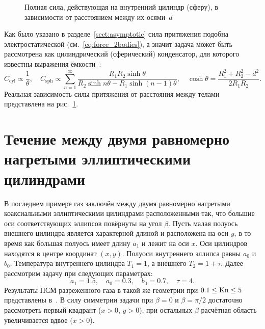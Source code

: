 \begin{figure}[ht]
    \centering
    \caption{Полная сила, действующая на внутренний цилиндр (сферу),
        в зависимости от расстоянием между их осями~\(d\)}
    \label{fig:forces:distance}
\end{figure}

Как было указано в разделе~\ref{sect:asymptotic} сила притяжения подобна электростатической (см.~\eqref{eq:force_2bodies}),
а значит задача может быть рассмотрена как цилиндрический (сферический) конденсатор,
для которого известны выражения ёмкости~\cite{Smythe1954}:
\begin{equation}
    C_\mathrm{cyl} \propto \frac1{\theta}, \quad
    C_\mathrm{sph} \propto  \sum_{n=1}^\infty \frac{R_1 R_2 \sinh\theta} {R_2\sinh n\theta - R_1\sinh (n-1)\theta}, \quad
    \cosh\theta = \frac{R_1^2 + R_2^2 - d^2}{2 R_1 R_2}.
\end{equation}
Реальная зависимость силы притяжения от расстояния между телами представлена на рис.~\ref{fig:forces:distance}.

\section{Течение между двумя равномерно нагретыми эллиптическими цилиндрами} \label{sect:elliptic}

В последнем примере газ заключён между двумя равномерно нагретыми коаксиальными эллиптическими цилиндрами
расположенными так, что большие оси соответствующих эллипсов повёрнуты на угол \(\beta\).
Пусть малая полуось внешнего цилиндра является характерной длиной и расположена на оси \(y\),
в то время как большая полуось имеет длину \(a_1\) и лежит на оси \(x\).
Оси цилиндров находятся в центре координат \((x,y)\). Полуоси внутреннего эллипса равны \(a_0\) и \(b_0\).
Температура внутреннего цилиндра \(T_1 = 1\), а внешнего \(T_2 = 1+\tau\).
Далее рассмотрим задачу при следующих параметрах:
\[ a_1 = 1.5, \quad a_0 = 0.3, \quad b_0 = 0.7, \quad \tau = 4. \]
Результаты ПСМ разреженного газа в такой же геометрии при \(0.1\le\mathrm{Kn}\le5\) представлены в~\cite{Sone1998}.
В силу симметрии задачи при \(\beta=0\) и \(\beta=\pi/2\) достаточно рассмотреть первый квадрант (\(x>0\), \(y>0\)),
при остальных \(\beta\) расчётная область увеличивается вдвое (\(x>0\)).

